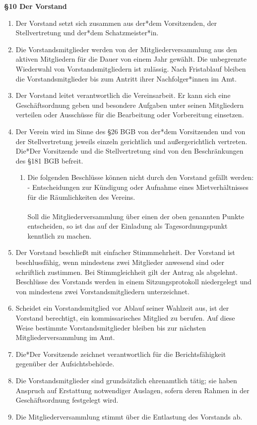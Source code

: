 \documentclass[a4paper,
               12pt,
               titlepage,
               parskip=half]{scrartcl}
\begin{document}
\textbf{§10 Der Vorstand}
{\small
	\begin{enumerate}
		\item Der Vorstand setzt sich zusammen aus der*dem Vorsitzenden, der Stellvertretung und der*dem Schatzmeister*in.
		\item Die Vorstandsmitglieder werden von der Mitgliederversammlung aus den aktiven Mitgliedern für die Dauer von einem Jahr gewählt. Die unbegrenzte Wiederwahl von Vorstandsmitgliedern ist zulässig. Nach Fristablauf bleiben die Vorstandsmitglieder bis zum Antritt ihrer Nachfolger*innen im Amt.
		\item Der Vorstand leitet verantwortlich die Vereinsarbeit. Er kann sich eine Geschäftsordnung geben und besondere Aufgaben unter seinen Mitgliedern verteilen oder Ausschüsse für die Bearbeitung oder Vorbereitung einsetzen.
		\item Der Verein wird im Sinne des §26 BGB von der*dem Vorsitzenden und von der Stellvertretung jeweils einzeln gerichtlich und außergerichtlich vertreten. Die*Der Vorsitzende und die Stellvertretung sind von den Beschränkungen des §181 BGB befreit.
		\begin{enumerate}[label=\arabic{enumi}\alph*.,leftmargin=0.0in]
			\item Die folgenden Beschlüsse können nicht durch den Vorstand gefällt werden:\\
			- Entscheidungen zur Kündigung oder Aufnahme eines Mietverhältnisses für die Räumlichkeiten des Vereins.\\\\
			Soll die Mitgliederversammlung über einen der oben genannten Punkte entscheiden, so
			ist das auf der Einladung als Tagesordnungspunkt kenntlich zu machen.
	    \end{enumerate}
    	\item Der Vorstand beschließt mit einfacher Stimmmehrheit. Der Vorstand ist beschlussfähig, wenn mindestens zwei Mitglieder anwesend sind oder schriftlich zustimmen. Bei Stimmgleichheit gilt der Antrag als abgelehnt. Beschlüsse des Vorstands werden in einem Sitzungsprotokoll niedergelegt und von mindestens zwei Vorstandsmitgliedern unterzeichnet.
    	\item Scheidet ein Vorstandsmitglied vor Ablauf seiner Wahlzeit aus, ist der Vorstand berechtigt, ein kommissarisches Mitglied zu berufen. Auf diese Weise bestimmte Vorstandsmitglieder bleiben bis zur nächsten Mitgliederversammlung im Amt.
    	\item Die*Der Vorsitzende zeichnet verantwortlich für die Berichtsfähigkeit gegenüber der Aufsichtsbehörde.
    	\item Die Vorstandsmitglieder sind grundsätzlich ehrenamtlich tätig; sie haben Anspruch auf Erstattung notwendiger Auslagen, sofern deren Rahmen in der Geschäftsordnung festgelegt wird.
    	\item Die Mitgliederversammlung stimmt über die Entlastung des Vorstands ab.
	\end{enumerate}
}
\end{document}
